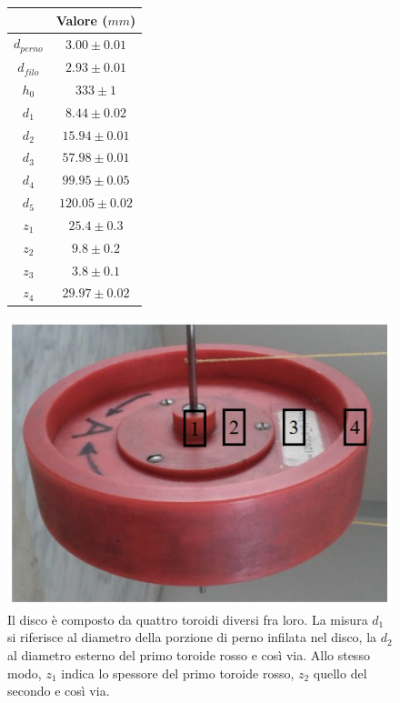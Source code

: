 \documentclass{article}
\begin{document}
\begin{figure}[h!]
\centering
\begin{minipage}{.5\textwidth}
\centering
\begin{tabular}{|c|c|}
\hline
 & Valore ($mm$) \\
\hline
$d_{perno}$ & $3.00 \pm 0.01$ \\
\hline
$d_{filo}$ & $2.93 \pm 0.01$ \\
\hline
$h_{0}$ & $333 \pm 1$ \\
\hline
$d_{1}$ & $8.44 \pm 0.02$ \\
\hline
$d_{2}$ & $15.94 \pm 0.01$ \\
\hline
$d_{3}$ & $57.98 \pm 0.01$ \\
\hline
$d_{4}$ & $99.95 \pm 0.05$ \\
\hline
$d_{5}$ & $120.05 \pm 0.02$ \\
\hline
$z_{1}$ & $25.4 \pm 0.3$ \\
\hline
$z_{2}$ & $9.8 \pm 0.2$ \\
\hline
$z_{3}$ & $3.8 \pm 0.1$ \\
\hline
$z_{4}$ & $29.97 \pm 0.02$ \\
\hline
\end{tabular}
\end{minipage}%
\begin{minipage}{.5\textwidth}
\centering
\includegraphics[width=\textwidth]{toroide}
\end{minipage}
\caption{Il disco è composto da quattro toroidi diversi fra loro. La misura $d_1$ si riferisce al diametro della porzione di perno infilata nel disco, la $d_2$ al diametro esterno del primo toroide rosso e così via. Allo stesso modo, $z_1$ indica lo spessore del primo toroide rosso, $z_2$ quello del secondo e così via.}
\label{figure:schema_disco}
\end{figure}
\end{document}
